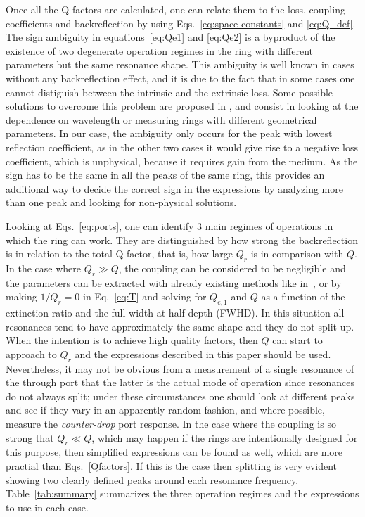 \documentclass[10pt,letterpaper]{article}
\begin{document}
Once all the Q-factors are calculated, one can relate them to the loss, coupling coefficients and backreflection by using Eqs.~\ref{eq:space-constants} and \ref{eq:Q_def}. The sign ambiguity in equations~\ref{eq:Qe1} and \ref{eq:Qe2} is a byproduct of the existence of two degenerate operation regimes in the ring with different parameters but the same resonance shape. This ambiguity is well known in cases without any backreflection effect, and it is due to the fact  that in some cases one cannot distiguish between the intrinsic and the extrinsic loss. Some possible solutions to overcome this problem are proposed in \cite{McKinnon2009}, and consist in looking at the dependence on wavelength or measuring rings with different geometrical parameters. In our case, the ambiguity only occurs for the peak with lowest reflection coefficient, as in the other two cases it would give rise to a negative loss coefficient, which is unphysical, because it requires gain from the medium. As the sign has to be the same in all the peaks of the same ring, this provides an additional way to decide the correct sign in the expressions by analyzing more than one peak and looking for non-physical solutions.



Looking at Eqs.~\ref{eq:ports}, one can identify 3 main regimes of operations in which the ring can work. They are distinguished by how strong the backreflection is in relation to the total Q-factor, that is, how large $Q_r$ is in comparison with $Q$. In the case where $Q_r \gg Q$, the coupling can be considered to be negligible and the parameters can be extracted with already existing methods like in~\cite{McKinnon2009}, or by making $1/Q_r=0$ in Eq.~\ref{eq:T} and solving for $Q_{e,1}$ and $Q$ as a function of the extinction ratio and the full-width at half depth (FWHD). In this situation all resonances tend to have approximately the same shape and they do not split up. When the intention is to achieve high quality factors, then $Q$ can start to approach to $Q_r$ and the expressions described in this paper should be used. Nevertheless, it may not be obvious from a measurement of a single resonance of the through port that the latter is the actual mode of operation since resonances do not always split; under these circumstances one should look at different peaks and see if they vary in an apparently random fashion, and where possible, measure the \emph{counter-drop} port response. In the case where the coupling is so strong that $Q_r \ll Q$, which may happen if the rings are intentionally designed for this purpose, then simplified expressions can be found as well, which are more practial than Eqs.~\ref{Qfactors}.  If this is the case then splitting is very evident showing two clearly defined peaks around each resonance frequency. Table~\ref{tab:summary} summarizes the three operation regimes and the expressions to use in each case.
\end{document}
